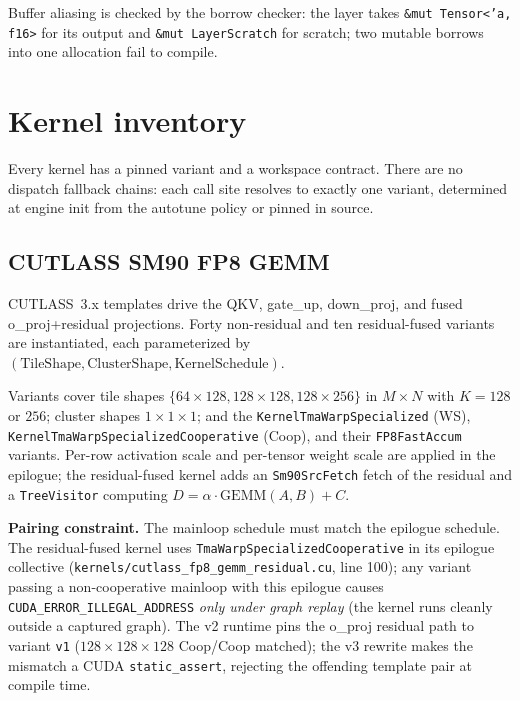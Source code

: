 Buffer aliasing is checked by the borrow checker: the layer takes
\texttt{\&mut Tensor<'a, f16>} for its output and \texttt{\&mut LayerScratch}
for scratch; two mutable borrows into one allocation fail to compile.

\section{Kernel inventory}
\label{sec:kernels}

Every kernel has a pinned variant and a workspace contract. There are
no dispatch fallback chains: each call site resolves to exactly one
variant, determined at engine init from the autotune policy or pinned
in source.

\subsection{CUTLASS SM90 FP8 GEMM}

CUTLASS~3.x templates drive the QKV, gate\_up, down\_proj, and fused
o\_proj+residual projections. Forty non-residual and ten residual-fused
variants are instantiated, each parameterized by
$(\text{TileShape}, \text{ClusterShape}, \text{KernelSchedule})$.

Variants cover tile shapes
$\{64\!\times\!128, 128\!\times\!128, 128\!\times\!256\}$ in $M\!\times\!N$
with $K\!=\!128$ or $256$; cluster shapes $1\!\times\!1\!\times\!1$; and
the \texttt{KernelTmaWarpSpecialized} (WS),
\texttt{KernelTmaWarpSpecializedCooperative} (Coop), and their
\texttt{FP8FastAccum} variants. Per-row activation scale and per-tensor
weight scale are applied in the epilogue; the residual-fused kernel adds
an \texttt{Sm90SrcFetch} fetch of the residual and a \texttt{TreeVisitor}
computing $D = \alpha\cdot\text{GEMM}(A,B) + C$.

\textbf{Pairing constraint.} The mainloop schedule must match the
epilogue schedule. The residual-fused kernel uses
\texttt{TmaWarpSpecializedCooperative} in its epilogue collective
(\texttt{kernels/cutlass\_fp8\_gemm\_residual.cu}, line 100); any variant
passing a non-cooperative mainloop with this epilogue causes
\texttt{CUDA\_ERROR\_ILLEGAL\_ADDRESS} \emph{only under graph replay}
(the kernel runs cleanly outside a captured graph). The v2 runtime pins
the o\_proj residual path to variant \texttt{v1}
($128\!\times\!128\!\times\!128$ Coop/Coop matched); the v3 rewrite makes
the mismatch a CUDA \texttt{static\_assert}, rejecting the offending
template pair at compile time.

